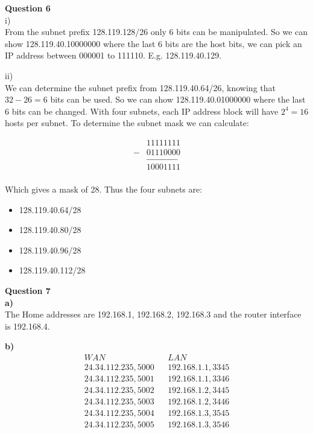 \documentclass{article}
\begin{document}
\bigskip
{\bf Question 6}\\
i)\\
From the subnet prefix 128.119.128/26 only 6 bits can be manipulated. So we can show 128.119.40.10000000 where the last 6 bits are the host bits, we can pick an IP address between 000001 to 111110. E.g. 128.119.40.129.

ii)\\
We can determine the subnet prefix from 128.119.40.64/26, knowing that $32-26=6$ bits can be used. So we can show 128.119.40.01000000 where the last 6 bits can be changed. With four subnets, each IP address block will have $2^4=16$ hosts per subnet. To determine the subnet mask we can calculate:

\begin{equation*}
    \begin{split}
       & 11111111\\
       - & 01110000\\
       &\text{\_\_\_\_\_\_\_\_\_\_\_}\\
       & 10001111\\
    \end{split}
\end{equation*}

Which gives a mask of 28. Thus the four subnets are:

\begin{itemize}
  \item 128.119.40.64/28
  \item 128.119.40.80/28
  \item 128.119.40.96/28
  \item 128.119.40.112/28
\end{itemize}


\bigskip
{\bf Question 7}\\
{\bf a)}\\
The Home addresses are 192.168.1, 192.168.2, 192.168.3 and the router interface is 192.168.4.

{\bf b)}\\
\begin{align*}
WAN && LAN\\
24.34.112.235, 5000 && 192.168.1.1, 3345\\
24.34.112.235, 5001 && 192.168.1.1, 3346\\
24.34.112.235, 5002 && 192.168.1.2, 3445\\
24.34.112.235, 5003 && 192.168.1.2, 3446\\
24.34.112.235, 5004 && 192.168.1.3, 3545\\
24.34.112.235, 5005 && 192.168.1.3, 3546\\
\end{align*}
\end{document}
